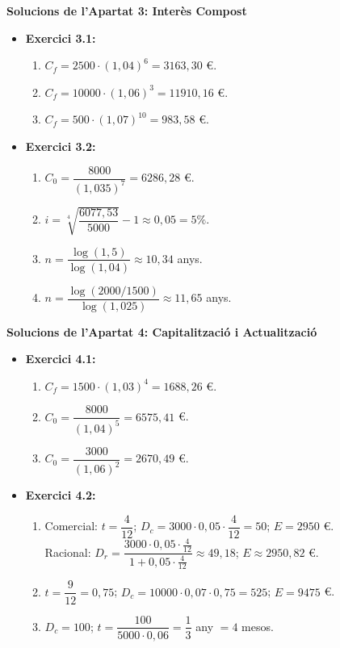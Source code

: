 \documentclass[12pt]{article}
\begin{document}
\begin{solucio}
\textbf{Solucions de l'Apartat 3: Interès Compost}
\begin{itemize}
    \item \textbf{Exercici 3.1:}
    \begin{enumerate}[label=\alph*)]
        \item $C_f = 2500 \cdot (1{,}04)^6 = 3163{,}30$ €.
        \item $C_f = 10000 \cdot (1{,}06)^3 = 11910{,}16$ €.
        \item $C_f = 500 \cdot (1{,}07)^{10} = 983{,}58$ €.
    \end{enumerate}
    \item \textbf{Exercici 3.2:}
    \begin{enumerate}[label=\alph*)]
        \item $C_0 = \dfrac{8000}{(1{,}035)^7} = 6286{,}28$ €.
        \item $i = \sqrt[4]{\dfrac{6077{,}53}{5000}} - 1 \approx 0{,}05 = 5\%$.
        \item $n = \dfrac{\log(1{,}5)}{\log(1{,}04)} \approx 10{,}34$ anys.
        \item $n = \dfrac{\log(2000/1500)}{\log(1{,}025)} \approx 11{,}65$ anys.
    \end{enumerate}
\end{itemize}
\end{solucio}

\begin{solucio}
\textbf{Solucions de l'Apartat 4: Capitalització i Actualització}
\begin{itemize}
    \item \textbf{Exercici 4.1:}
    \begin{enumerate}[label=\alph*)]
        \item $C_f = 1500 \cdot (1{,}03)^4 = 1688{,}26$ €.
        \item $C_0 = \dfrac{8000}{(1{,}04)^5} = 6575{,}41$ €.
        \item $C_0 = \dfrac{3000}{(1{,}06)^2} = 2670{,}49$ €.
    \end{enumerate}
    \item \textbf{Exercici 4.2:}
    \begin{enumerate}[label=\alph*)]
        \item Comercial: $t = \dfrac{4}{12}$; $D_c = 3000 \cdot 0{,}05 \cdot \dfrac{4}{12} = 50$; $E = 2950$ €. \\
        Racional: $D_r = \dfrac{3000 \cdot 0{,}05 \cdot \frac{4}{12}}{1 + 0{,}05 \cdot \frac{4}{12}} \approx 49{,}18$; $E \approx 2950{,}82$ €.
        \item $t = \dfrac{9}{12} = 0{,}75$; $D_c = 10000 \cdot 0{,}07 \cdot 0{,}75 = 525$; $E = 9475$ €.
        \item $D_c = 100$; $t = \dfrac{100}{5000 \cdot 0{,}06} = \dfrac{1}{3}$ any $= 4$ mesos.
    \end{enumerate}
\end{itemize}
\end{solucio}
\end{document}
